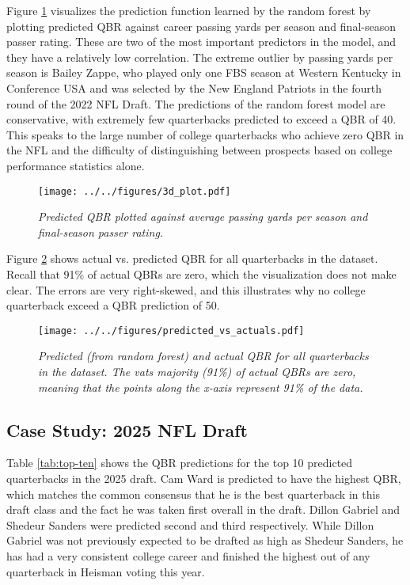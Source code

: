 \documentclass{article}
\begin{document}
Figure \ref{fig:3d-plot} visualizes the prediction function learned by the random forest by plotting predicted QBR against career passing yards per season and final-season passer rating. These are two of the most important predictors in the model, and they have a relatively low correlation. The extreme outlier by passing yards per season is Bailey Zappe, who played only one FBS season at Western Kentucky in Conference USA and was selected by the New England Patriots in the fourth round of the 2022 NFL Draft. The predictions of the random forest model are conservative, with extremely few quarterbacks predicted to exceed a QBR of 40. This speaks to the large number of college quarterbacks who achieve zero QBR in the NFL and the difficulty of distinguishing between prospects based on college performance statistics alone.

\begin{figure}[H]
    \centering
    \texttt{[image: ../../figures/3d\_plot.pdf]}
    \caption{\textit{Predicted QBR plotted against average passing yards per season and final-season passer rating.}}
    \label{fig:3d-plot}
\end{figure}

Figure \ref{fig:predicted-vs-actuals} shows actual vs. predicted QBR for all quarterbacks in the dataset. Recall that 91\% of actual QBRs are zero, which the visualization does not make clear. The errors are very right-skewed, and this illustrates why no college quarterback exceed a QBR prediction of 50.

\begin{figure}[H]
  \centering
  \texttt{[image: ../../figures/predicted\_vs\_actuals.pdf]}
  \caption{\textit{Predicted (from random forest) and actual QBR for all quarterbacks in the dataset. The vats majority (91\%) of actual QBRs are zero, meaning that the points along the x-axis represent 91\% of the data.}}
  \label{fig:predicted-vs-actuals}
\end{figure}

\subsection{Case Study: 2025 NFL Draft}

Table \ref{tab:top-ten} shows the QBR predictions for the top 10 predicted quarterbacks in the 2025 draft. Cam Ward is predicted to have the highest QBR, which matches the common consensus that he is the best quarterback in this draft class and the fact he was taken first overall in the draft. Dillon Gabriel and Shedeur Sanders were predicted second and third respectively. While Dillon Gabriel was not previously expected to be drafted as high as Shedeur Sanders, he has had a very consistent college career and finished the highest out of any quarterback in Heisman voting this year.
\end{document}
